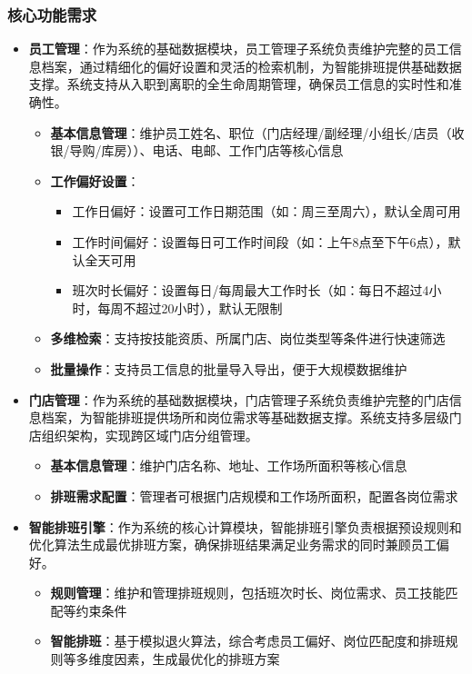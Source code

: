 \documentclass{ctexart}
\begin{document}
\subsubsection{核心功能需求}
\begin{itemize}
    \item \textbf{员工管理}：作为系统的基础数据模块，员工管理子系统负责维护完整的员工信息档案，通过精细化的偏好设置和灵活的检索机制，为智能排班提供基础数据支撑。系统支持从入职到离职的全生命周期管理，确保员工信息的实时性和准确性。
        \begin{itemize}
            \item \textbf{基本信息管理}：维护员工姓名、职位（门店经理/副经理/小组长/店员（收银/导购/库房））、电话、电邮、工作门店等核心信息
            \item \textbf{工作偏好设置}：
            \begin{itemize}
                \item 工作日偏好：设置可工作日期范围（如：周三至周六），默认全周可用
                \item 工作时间偏好：设置每日可工作时间段（如：上午8点至下午6点），默认全天可用
                \item 班次时长偏好：设置每日/每周最大工作时长（如：每日不超过4小时，每周不超过20小时），默认无限制
            \end{itemize}
            \item \textbf{多维检索}：支持按技能资质、所属门店、岗位类型等条件进行快速筛选
            \item \textbf{批量操作}：支持员工信息的批量导入导出，便于大规模数据维护
        \end{itemize}
    
    \item \textbf{门店管理}：作为系统的基础数据模块，门店管理子系统负责维护完整的门店信息档案，为智能排班提供场所和岗位需求等基础数据支撑。系统支持多层级门店组织架构，实现跨区域门店分组管理。
        \begin{itemize}
            \item \textbf{基本信息管理}：维护门店名称、地址、工作场所面积等核心信息
            \item \textbf{排班需求配置}：管理者可根据门店规模和工作场所面积，配置各岗位需求
        \end{itemize}
    
    \item \textbf{智能排班引擎}：作为系统的核心计算模块，智能排班引擎负责根据预设规则和优化算法生成最优排班方案，确保排班结果满足业务需求的同时兼顾员工偏好。
        \begin{itemize}
            \item \textbf{规则管理}：维护和管理排班规则，包括班次时长、岗位需求、员工技能匹配等约束条件
            \item \textbf{智能排班}：基于模拟退火算法，综合考虑员工偏好、岗位匹配度和排班规则等多维度因素，生成最优化的排班方案
        \end{itemize}
    

\end{itemize}
\end{document}
